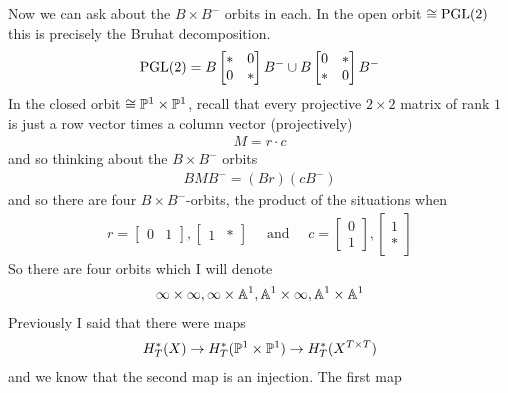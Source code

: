 \documentclass[12pt]{article}
\begin{document}
Now we can ask about the $B\times B^-$ orbits in each. In the open orbit $\cong \PGL(2)$ this is precisely
the Bruhat decomposition. \begin{align*}
	\PGL(2) = B\begin{bmatrix}
		           * & 0 \\
		           0 & *
	           \end{bmatrix}B^- \cup B\begin{bmatrix}
		                                  0 & * \\
		                                  * & 0
	                                  \end{bmatrix}B^-
\end{align*}
In the closed orbit $\cong \P^1\times \P^1$, recall that every projective $2\times 2$ matrix of rank $1$ is just a row
vector times a column vector (projectively) \begin{align*}
	M = r\cdot c
\end{align*} and so thinking about the $B\times B^-$ orbits \begin{align*}
	BMB^- = (Br)(cB^-)
\end{align*} and so there are four $B\times B^-$-orbits, the product of the situations when \begin{align*}
	r = \begin{bmatrix}
		    0 & 1
	    \end{bmatrix}, \begin{bmatrix}
		                   1 & *
	                   \end{bmatrix} \quad \text{ and } \quad c = \begin{bmatrix}
		                                                              0 \\ 1
	                                                              \end{bmatrix}, \begin{bmatrix}
		                                                                             1 \\ *
	                                                                             \end{bmatrix}
\end{align*}
So there are four orbits which I will denote \begin{align*}
	{\infty\times\infty},{\infty\times \A^1}, {\A^1\times \infty}, {\A^1\times \A^1}
\end{align*} Previously I said that there were maps \begin{align*}
	H_T^*(X)\to H_T^*(\P^1\times \P^1)\to H_T^*(X^{T\times T})
\end{align*} and we know that the second map is an injection. The first map
\end{document}
